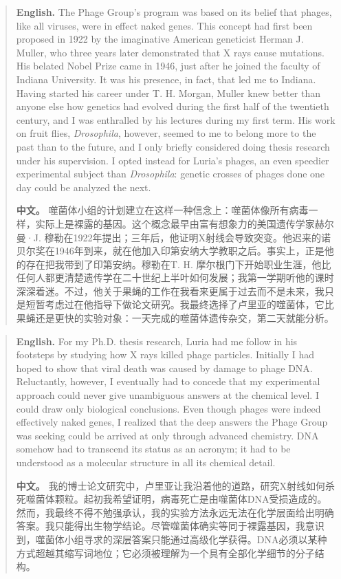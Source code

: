\begin{quote}
\noindent\textbf{English.} The Phage Group's program was based on its belief that phages, like all viruses, were in effect naked genes. This concept had first been proposed in 1922 by the imaginative American geneticist Herman J. Muller, who three years later demonstrated that X rays cause mutations. His belated Nobel Prize came in 1946, just after he joined the faculty of Indiana University. It was his presence, in fact, that led me to Indiana. Having started his career under T. H. Morgan, Muller knew better than anyone else how genetics had evolved during the first half of the twentieth century, and I was enthralled by his lectures during my first term. His work on fruit flies, \emph{Drosophila}, however, seemed to me to belong more to the past than to the future, and I only briefly considered doing thesis research under his supervision. I opted instead for Luria's phages, an even speedier experimental subject than \emph{Drosophila}: genetic crosses of phages done one day could be analyzed the next.

\smallskip
\noindent\textbf{中文。} 噬菌体小组的计划建立在这样一种信念上：噬菌体像所有病毒一样，实际上是裸露的基因。这个概念最早由富有想象力的美国遗传学家赫尔曼·J. 穆勒在1922年提出；三年后，他证明X射线会导致突变。他迟来的诺贝尔奖在1946年到来，就在他加入印第安纳大学教职之后。事实上，正是他的存在把我带到了印第安纳。穆勒在T. H. 摩尔根门下开始职业生涯，他比任何人都更清楚遗传学在二十世纪上半叶如何发展；我第一学期听他的课时深深着迷。不过，他关于果蝇的工作在我看来更属于过去而不是未来，我只是短暂考虑过在他指导下做论文研究。我最终选择了卢里亚的噬菌体，它比果蝇还是更快的实验对象：一天完成的噬菌体遗传杂交，第二天就能分析。
\end{quote}

\begin{quote}
\noindent\textbf{English.} For my Ph.D. thesis research, Luria had me follow in his footsteps by studying how X rays killed phage particles. Initially I had hoped to show that viral death was caused by damage to phage DNA. Reluctantly, however, I eventually had to concede that my experimental approach could never give unambiguous answers at the chemical level. I could draw only biological conclusions. Even though phages were indeed effectively naked genes, I realized that the deep answers the Phage Group was seeking could be arrived at only through advanced chemistry. DNA somehow had to transcend its status as an acronym; it had to be understood as a molecular structure in all its chemical detail.

\smallskip
\noindent\textbf{中文。} 我的博士论文研究中，卢里亚让我沿着他的道路，研究X射线如何杀死噬菌体颗粒。起初我希望证明，病毒死亡是由噬菌体DNA受损造成的。然而，我最终不得不勉强承认，我的实验方法永远无法在化学层面给出明确答案。我只能得出生物学结论。尽管噬菌体确实等同于裸露基因，我意识到，噬菌体小组寻求的深层答案只能通过高级化学获得。DNA必须以某种方式超越其缩写词地位；它必须被理解为一个具有全部化学细节的分子结构。
\end{quote}

